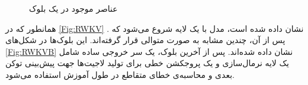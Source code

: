 \begin{figure}%
  \centering
  \qquad
  \caption{عناصر موجود در یک بلوک }
  \label{fig:example}%
\end{figure}

همانطور که در \ref{Fig:RWKV} نشان داده شده است،
مدل با یک لایه  شروع می‌شود که  . پس از آن، چندین   مشابه به صورت متوالی قرار گرفته‌اند. این بلوک‌ها در شکل‌های \ref{Fig:RWKVB} نشان داده شده‌اند. پس از آخرین بلوک، یک سر خروجی ساده شامل یک لایه نرمال‌سازی  و یک پروجکشن خطی برای تولید لاجیت‌ها  جهت پیش‌بینی توکن بعدی و محاسبه‌ی خطای متقاطع  در طول آموزش استفاده می‌شود.

